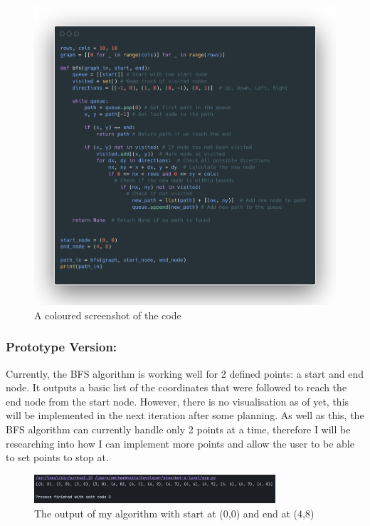 \begin{figure}[htbp!]
    \centering
    \includegraphics[width=1\linewidth]{Images/Source Code Image (2).png}
    \caption{A coloured screenshot of the code}
\end{figure}
\textbf{}\newline
\newpage

\subsubsection{Prototype Version:} 
Currently, the BFS algorithm is working well for 2 defined points: a start and end node. It outputs a basic list of the coordinates that were followed to reach the end node from the start node. However, there is no visualisation as of yet, this will be implemented in the next iteration after some planning. As well as this, the BFS algorithm can currently handle only 2 points at a time, therefore I will be researching into how I can implement more points and allow the user to be able to set points to stop at.
\begin{figure}[htbp]
    \centering
    \includegraphics[width=0.8\textwidth]{Images/Screenshot 2025-03-30 at 11.18.52.png}
    \caption{The output of my algorithm with start at (0,0) and end at (4,8)}
\end{figure}

